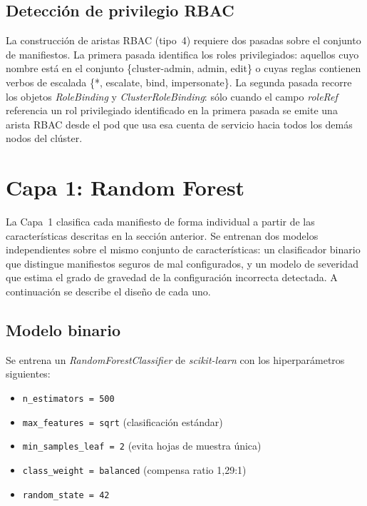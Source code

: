 \subsection{Detección de privilegio \acs{RBAC}}

La construcción de aristas \ac{RBAC} (tipo~4) requiere dos pasadas sobre el conjunto de
manifiestos. La primera pasada identifica los roles privilegiados: aquellos cuyo nombre
está en el conjunto \{cluster-admin, admin, edit\} o cuyas reglas contienen verbos de
escalada \{*, escalate, bind, impersonate\}. La segunda pasada recorre los objetos
\textit{RoleBinding} y \textit{ClusterRoleBinding}: sólo cuando el campo
\textit{roleRef} referencia un rol privilegiado identificado en la primera pasada se
emite una arista \ac{RBAC} desde el pod que usa esa cuenta de servicio hacia todos los demás
nodos del clúster.

\section{Capa 1: Random Forest}
\label{sec:capa1_diseno}

La Capa~1 clasifica cada manifiesto de forma individual a partir de las
características descritas en la sección anterior. Se entrenan dos modelos
independientes sobre el mismo conjunto de características: un clasificador
binario que distingue manifiestos seguros de mal configurados, y un modelo de
severidad que estima el grado de gravedad de la configuración incorrecta
detectada. A continuación se describe el diseño de cada uno.

\subsection{Modelo binario}

Se entrena un \textit{RandomForestClassifier} \citep{Breiman2001} de \textit{scikit-learn}
\citep{Pedregosa2011} con los hiperparámetros siguientes:

\begin{itemize}
  \item \texttt{n\_estimators = 500}
  \item \texttt{max\_features = sqrt} (clasificación estándar)
  \item \texttt{min\_samples\_leaf = 2} (evita hojas de muestra única)
  \item \texttt{class\_weight = balanced} (compensa ratio 1,29:1)
  \item \texttt{random\_state = 42}
\end{itemize}

